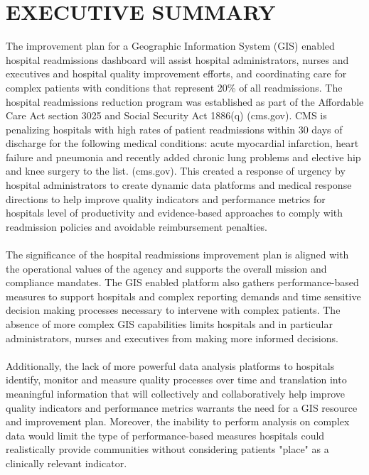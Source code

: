 \documentclass[11pt]{article}\usepackage[]{graphicx}\usepackage[]{color}
\begin{document}
\newpage

\section{EXECUTIVE SUMMARY}

The improvement plan for a Geographic Information System (GIS) enabled hospital readmissions dashboard will assist hospital administrators, nurses and executives and hospital quality improvement efforts, and coordinating care for complex patients with conditions that represent 20\% of all readmissions. The hospital readmissions reduction program was established as part of the Affordable Care Act section 3025 and Social Security Act 1886(q) (cms.gov). CMS is penalizing hospitals with high rates of patient readmissions within 30 days of discharge for the following medical conditions: acute myocardial infarction, heart failure and pneumonia and recently added chronic lung problems and elective hip and knee surgery to the list. (cms.gov). This created a response of urgency by hospital administrators to create dynamic data platforms and medical response directions to help improve quality indicators and performance metrics for hospitals level of productivity and evidence-based approaches to comply with readmission policies and avoidable reimbursement penalties.
\paragraph{}
The significance of the hospital readmissions improvement plan is aligned with the operational values of the agency and supports the overall mission and compliance mandates. The GIS enabled platform also gathers performance-based measures to support hospitals and complex reporting demands and time sensitive decision making processes necessary to intervene with complex patients. The absence of more complex GIS capabilities limits hospitals and in particular administrators, nurses and executives from making more informed decisions. 
\paragraph{}
Additionally, the lack of more powerful data analysis platforms to hospitals identify, monitor and measure quality processes over time and translation into meaningful information that will collectively and collaboratively help improve quality indicators and performance metrics warrants the need for a GIS resource and improvement plan. Moreover, the inability to perform analysis on complex data would limit the type of performance-based measures hospitals could realistically provide communities without considering patients "place" as a clinically relevant indicator.
\end{document}
